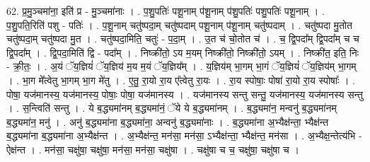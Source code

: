 \documentclass[17pt]{extarticle}
\begin{document}
62. प्र॒मु॒ञ्चमा॑ना॒ इति॑ प्र - मु॒ञ्चमा॑नाः । . प॒शु॒पतिः॑ पशू॒नाम् प॑शू॒नाम् प॑शु॒पतिः॑ पशु॒पतिः॑ पशू॒नाम् । . प॒शु॒पति॒रिति॑ पशु - पतिः॑ । . प॒शू॒नाम् चतु॑ष्पदा॒म् चतु॑ष्पदाम् पशू॒नाम् प॑शू॒नाम् चतु॑ष्पदाम् । . चतु॑ष्पदा मु॒तोत चतु॑ष्पदा॒म् चतु॑ष्पदा मु॒त । . चतु॑ष्पदा॒मिति॒ चतुः॑ - प॒दा॒म् । . उ॒त च॑ चो॒तोत च॑ । . च॒ द्वि॒पदा᳚म् द्वि॒पदा᳚म् च च द्वि॒पदा᳚म् । . द्वि॒पदा॒मिति॑ द्वि - पदा᳚म् । . निष्क्री॑तो॒ ऽय म॒यम् निष्क्री॑तो॒ निष्क्री॑तो॒ ऽयम् । . निष्क्री॑त॒ इति॒ निः - क्री॒तः॒ । . अ॒यं ॅय॒ज्ञियं॑ ॅय॒ज्ञिय॑ म॒य म॒यं ॅय॒ज्ञिय᳚म् । . य॒ज्ञिय॑म् भा॒गम् भा॒गं ॅय॒ज्ञियं॑ ॅय॒ज्ञिय॑म् भा॒गम् । . भा॒ग मे᳚त्वेतु भा॒गम् भा॒ग मे॑तु । . ए॒तु॒ रा॒यो रा॒य ए᳚त्वेतु रा॒यः । . रा॒य स्पोषाः॒ पोषा॑ रा॒यो रा॒य स्पोषाः᳚ । . पोषा॒ यज॑मानस्य॒ यज॑मानस्य॒ पोषाः॒ पोषा॒ यज॑मानस्य । . यज॑मानस्य सन्तु सन्तु॒ यज॑मानस्य॒ यज॑मानस्य सन्तु । . स॒न्त्विति॑ सन्तु । . ये ब॒द्ध्यमा॑नम् ब॒द्ध्यमा॑नं॒ ॅये ये ब॒द्ध्यमा॑नम् । . ब॒द्ध्यमा॑न॒ मन्वनु॑ ब॒द्ध्यमा॑नम् ब॒द्ध्यमा॑न॒ मनु॑ । . अनु॑ ब॒द्ध्यमा॑ना ब॒द्ध्यमा॑ना॒ अन्वनु॑ ब॒द्ध्यमा॑नाः । . ब॒द्ध्यमा॑ना अ॒भ्यैक्ष॑न्ता॒ भ्यैक्ष॑न्त ब॒द्ध्यमा॑ना ब॒द्ध्यमा॑ना अ॒भ्यैक्ष॑न्त । . अ॒भ्यैक्ष॑न्त॒ मन॑सा॒ मन॑सा॒ ऽभ्यैक्ष॑न्ता॒ भ्यैक्ष॑न्त॒ मन॑सा । . अ॒भ्यैक्ष॒न्तेत्य॑भि - ऐक्ष॑न्त । . मन॑सा॒ चक्षु॑षा॒ चक्षु॑षा॒ मन॑सा॒ मन॑सा॒ चक्षु॑षा । . चक्षु॑षा च च॒ चक्षु॑षा॒ चक्षु॑षा च । \newline
\end{document}
